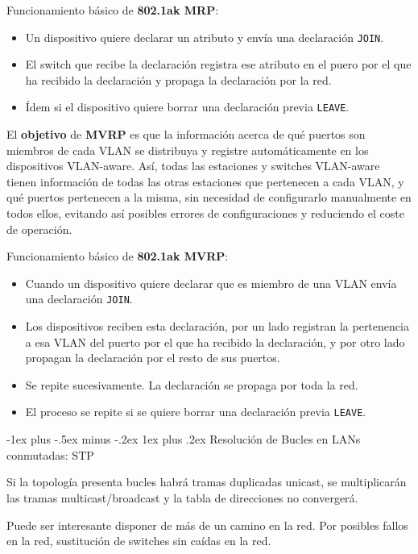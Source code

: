 \documentclass[10pt,portrait, twocolumn]{article}
\makeatletter
\renewcommand{\subsubsection}{\@startsection{subsubsection}{3}{0mm}%
                                {-1ex plus -.5ex minus -.2ex}%
                                {1ex plus .2ex}%
                                {\normalfont\small\bfseries}}
\makeatother
\begin{document}
Funcionamiento básico de \textbf{802.1ak MRP}:
	\begin{itemize}
	\item Un dispositivo quiere declarar un atributo y envía una declaración \texttt{JOIN}.
	\item El switch que recibe la declaración registra ese atributo en el puero por el que ha recibido la declaración y propaga la declaración por la red.
	\item Ídem si el dispositivo quiere borrar una declaración previa \texttt{LEAVE}.
	\end{itemize}

El \textbf{objetivo} de \textbf{MVRP} es que la información acerca de qué puertos son miembros de cada VLAN se distribuya y registre automáticamente en los dispositivos VLAN-aware. Así, todas las estaciones y switches VLAN-aware tienen información de todas las otras estaciones que pertenecen a cada VLAN, y qué puertos pertenecen a la misma, sin necesidad de configurarlo manualmente en todos ellos, evitando así posibles errores de configuraciones y reduciendo el coste de operación.

\quad Funcionamiento básico de \textbf{802.1ak MVRP}:
	\begin{itemize}
	\item Cuando un dispositivo quiere declarar que es miembro de una VLAN envía una declaración \texttt{JOIN}.
	\item Los dispositivos reciben esta declaración, por un lado registran la pertenencia a esa VLAN del puerto por el que ha recibido la declaración, y por otro lado propagan la declaración por el resto de sus puertos.
	\item Se repite sucesivamente. La declaración se propaga por toda la red.
	\item El proceso se repite si se quiere borrar una declaración previa \texttt{LEAVE}.
	\end{itemize}

\subsubsection{Resolución de Bucles en LANs conmutadas: STP}

Si la topología presenta bucles habrá tramas duplicadas unicast, se multiplicarán las tramas multicast/broadcast y la tabla de direcciones no convergerá.

\quad Puede ser interesante disponer de más de un camino en la red. Por posibles fallos en la red, sustitución de switches sin caídas en la red.
\end{document}
